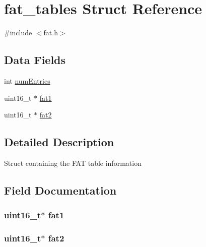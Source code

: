 \hypertarget{structfat__tables}{}\section{fat\+\_\+tables Struct Reference}
\label{structfat__tables}


{\ttfamily \#include $<$fat.\+h$>$}

\subsection*{Data Fields}
\begin{DoxyCompactItemize}
\item 
int \hyperlink{structfat__tables_a75b15f0e26b4ccf3195772b134b660ec}{num\+Entries}
\item 
uint16\+\_\+t $\ast$ \hyperlink{structfat__tables_a45f86c4c2f51c8fe61e736c8d9449abf}{fat1}
\item 
uint16\+\_\+t $\ast$ \hyperlink{structfat__tables_a639b4d55f6ba2085dc48551d4234af67}{fat2}
\end{DoxyCompactItemize}


\subsection{Detailed Description}
Struct containing the F\+AT table information 

\subsection{Field Documentation}
\subsubsection[{\texorpdfstring{fat1}{fat1}}]{\setlength{\rightskip}{0pt plus 5cm}uint16\+\_\+t$\ast$ fat1}\hypertarget{structfat__tables_a45f86c4c2f51c8fe61e736c8d9449abf}{}\label{structfat__tables_a45f86c4c2f51c8fe61e736c8d9449abf}
\subsubsection[{\texorpdfstring{fat2}{fat2}}]{\setlength{\rightskip}{0pt plus 5cm}uint16\+\_\+t$\ast$ fat2}\hypertarget{structfat__tables_a639b4d55f6ba2085dc48551d4234af67}{}\label{structfat__tables_a639b4d55f6ba2085dc48551d4234af67}
